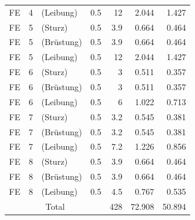 \documentclass[11pt, a4paper]{article}
\theoremstyle{definition}
\begin{document}
\begin{table}[H]
\begin{tabular}{ccccrrr}
    \multicolumn{1}{l}{FE} & \multicolumn{1}{r}{4} & \multicolumn{1}{l}{(Leibung)} & \multicolumn{1}{r}{0.5} & 12   & 2.044 & 1.427 \\
    \multicolumn{1}{l}{FE} & \multicolumn{1}{r}{5} & \multicolumn{1}{l}{(Sturz)} & \multicolumn{1}{r}{0.5} & 3.9  & 0.664 & 0.464 \\
    \multicolumn{1}{l}{FE} & \multicolumn{1}{r}{5} & \multicolumn{1}{l}{(Brüstung)} & \multicolumn{1}{r}{0.5} & 3.9  & 0.664 & 0.464 \\
    \multicolumn{1}{l}{FE} & \multicolumn{1}{r}{5} & \multicolumn{1}{l}{(Leibung)} & \multicolumn{1}{r}{0.5} & 12   & 2.044 & 1.427 \\
    \multicolumn{1}{l}{FE} & \multicolumn{1}{r}{6} & \multicolumn{1}{l}{(Sturz)} & \multicolumn{1}{r}{0.5} & 3    & 0.511 & 0.357 \\
    \multicolumn{1}{l}{FE} & \multicolumn{1}{r}{6} & \multicolumn{1}{l}{(Brüstung)} & \multicolumn{1}{r}{0.5} & 3    & 0.511 & 0.357 \\
    \multicolumn{1}{l}{FE} & \multicolumn{1}{r}{6} & \multicolumn{1}{l}{(Leibung)} & \multicolumn{1}{r}{0.5} & 6    & 1.022 & 0.713 \\
    \multicolumn{1}{l}{FE} & \multicolumn{1}{r}{7} & \multicolumn{1}{l}{(Sturz)} & \multicolumn{1}{r}{0.5} & 3.2  & 0.545 & 0.381 \\
    \multicolumn{1}{l}{FE} & \multicolumn{1}{r}{7} & \multicolumn{1}{l}{(Brüstung)} & \multicolumn{1}{r}{0.5} & 3.2  & 0.545 & 0.381 \\
    \multicolumn{1}{l}{FE} & \multicolumn{1}{r}{7} & \multicolumn{1}{l}{(Leibung)} & \multicolumn{1}{r}{0.5} & 7.2  & 1.226 & 0.856 \\
    \multicolumn{1}{l}{FE} & \multicolumn{1}{r}{8} & \multicolumn{1}{l}{(Sturz)} & \multicolumn{1}{r}{0.5} & 3.9  & 0.664 & 0.464 \\
    \multicolumn{1}{l}{FE} & \multicolumn{1}{r}{8} & \multicolumn{1}{l}{(Brüstung)} & \multicolumn{1}{r}{0.5} & 3.9  & 0.664 & 0.464 \\
    \multicolumn{1}{l}{FE} & \multicolumn{1}{r}{8} & \multicolumn{1}{l}{(Leibung)} & \multicolumn{1}{r}{0.5} & 4.5  & 0.767 & 0.535 \\
    \hline
    \multicolumn{4}{c}{Total} & 428  & 72.908 & 50.894 \\
    \bottomrule
    \end{tabular}%
  \label{tab:SumatraThermalBridgeLoss}%
\end{table}%
\end{document}
